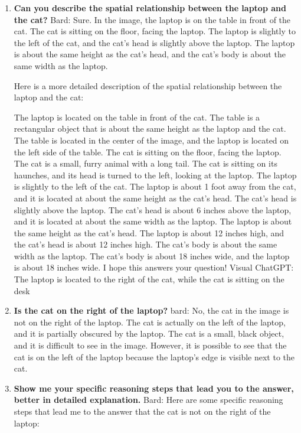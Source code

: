     \begin{enumerate}
        \item \textbf{Can you describe the spatial relationship between the laptop and the cat?}
        \subitem Bard: Sure. In the image, the laptop is on the table in front of the cat. The cat is sitting on the floor, facing the laptop. The laptop is slightly to the left of the cat, and the cat's head is slightly above the laptop. The laptop is about the same height as the cat's head, and the cat's body is about the same width as the laptop.

        Here is a more detailed description of the spatial relationship between the laptop and the cat:
        
        The laptop is located on the table in front of the cat. The table is a rectangular object that is about the same height as the laptop and the cat. The table is located in the center of the image, and the laptop is located on the left side of the table.
        The cat is sitting on the floor, facing the laptop. The cat is a small, furry animal with a long tail. The cat is sitting on its haunches, and its head is turned to the left, looking at the laptop.
        The laptop is slightly to the left of the cat. The laptop is about 1 foot away from the cat, and it is located at about the same height as the cat's head.
        The cat's head is slightly above the laptop. The cat's head is about 6 inches above the laptop, and it is located at about the same width as the laptop.
        The laptop is about the same height as the cat's head. The laptop is about 12 inches high, and the cat's head is about 12 inches high.
        The cat's body is about the same width as the laptop. The cat's body is about 18 inches wide, and the laptop is about 18 inches wide.
        I hope this answers your question!
        \subitem Visual ChatGPT: The laptop is located to the right of the cat, while the cat is sitting on the desk
        \item \textbf{Is the cat on the right of the laptop?}
        \subitem bard: No, the cat in the image is not on the right of the laptop. The cat is actually on the left of the laptop, and it is partially obscured by the laptop. The cat is a small, black object, and it is difficult to see in the image. However, it is possible to see that the cat is on the left of the laptop because the laptop's edge is visible next to the cat.
        \item \textbf{Show me your specific reasoning steps that lead you to the answer, better in detailed explanation.}
        \subitem Bard:
        Here are some specific reasoning steps that lead me to the answer that the cat is not on the right of the laptop:


\end{enumerate}
